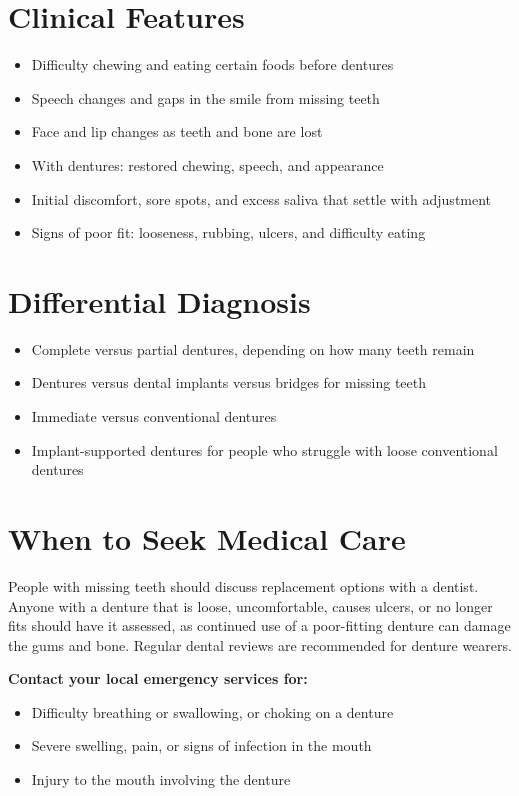 \section*{Clinical Features}
\begin{itemize}
    \item Difficulty chewing and eating certain foods before dentures
    \item Speech changes and gaps in the smile from missing teeth
    \item Face and lip changes as teeth and bone are lost
    \item With dentures: restored chewing, speech, and appearance
    \item Initial discomfort, sore spots, and excess saliva that settle with adjustment
    \item Signs of poor fit: looseness, rubbing, ulcers, and difficulty eating
\end{itemize}

\section*{Differential Diagnosis}
\begin{itemize}
    \item Complete versus partial dentures, depending on how many teeth remain
    \item Dentures versus dental implants versus bridges for missing teeth
    \item Immediate versus conventional dentures
    \item Implant-supported dentures for people who struggle with loose conventional dentures
\end{itemize}

\section*{When to Seek Medical Care}
People with missing teeth should discuss replacement options with a dentist. Anyone with a denture that is loose, uncomfortable, causes ulcers, or no longer fits should have it assessed, as continued use of a poor-fitting denture can damage the gums and bone. Regular dental reviews are recommended for denture wearers.

\textbf{Contact your local emergency services for:}
\begin{itemize}
    \item Difficulty breathing or swallowing, or choking on a denture
    \item Severe swelling, pain, or signs of infection in the mouth
    \item Injury to the mouth involving the denture
\end{itemize}

